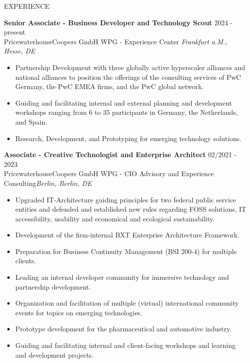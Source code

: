 \documentclass{resume} %
\begin{document}
\begin{rSection}{EXPERIENCE}

\textbf{Senior Associate - Business Developer and Technology Scout} \hfill 2024 - present\\
PricewaterhouseCoopers GmbH WPG - Experience Center \hfill \textit{Frankfurt a.M., Hesse, DE}
 \begin{itemize}
    \itemsep -3pt {} 
    \item Partnership Development with three globally active hyperscaler alliances and national alliances to position the offerings of the consulting services of PwC Germany, the PwC EMEA firms, and the PwC global network.
    \item Guiding and facilitating internal and external planning and development workshops ranging from 6 to 35 participants in Germany, the Netherlands, and Spain.
    \item Research, Development, and Prototyping for emerging technology solutions.
 \end{itemize}

\textbf{Associate - Creative Technologist and Enterprise Architect} \hfill 02/2021 - 2023\\
PricewaterhouseCoopers GmbH WPG - CIO Advisory and Experience Consulting\hfill \textit{Berlin, Berlin, DE}
 \begin{itemize}
    \itemsep -3pt {} 
    \item Upgraded IT-Architecture guiding principles for two federal public service entities and defended and established new rules regarding FOSS solutions, IT accessibility, usability and economical and ecological sustainability.
    \item Development of the firm-internal BXT Enterprise Architecture Framework. 
    \item Preparation for Business Continuity Management (BSI 200-4) for multiple clients.
     \item Leading an internal developer community for immersive technology and partnership development.
     \item Organization and facilitation of multiple (virtual) international community events for topics on emerging technologies.
    \item Prototype development for the pharmaceutical and automotive industry.
    \item Guiding and facilitating internal and client-facing workshops and learning and development projects.
 \end{itemize}


\end{rSection}
\end{document}
